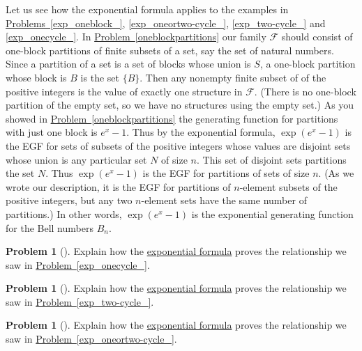 \documentclass[10pt,]{book}
\theoremstyle{plain}
\theoremstyle{definition}
\newtheorem{activity}[project]{Problem}
\theoremstyle{definition}
\numberwithin{equation}{chapter}
\newcommand{\F}{\mathcal{F}}
\begin{document}
Let us see how the exponential formula applies to the examples in \hyperref[exp_oneblock_]{Problems~\ref{exp_oneblock_}}, \hyperref[exp_oneortwo-cycle_]{\ref{exp_oneortwo-cycle_}}, \hyperref[exp_two-cycle_]{\ref{exp_two-cycle_}} and \hyperref[exp_onecycle_]{\ref{exp_onecycle_}}. In \hyperref[oneblockpartitions]{Problem~\ref{oneblockpartitions}} our family \(\F\) should consist of one-block partitions of finite subsets of a set, say the set of natural numbers.  Since a partition of a set is a set of blocks whose union is \(S\), a one-block partition whose block is \(B\) is the set \(\{B\}\). Then any nonempty finite subset of of the positive integers is the value of exactly one structure in \(\F\).  (There is no one-block partition of the empty set, so we have no structures using the empty set.) As you showed in \hyperref[oneblockpartitions]{Problem~\ref{oneblockpartitions}} the generating function for partitions with just one block is \(e^x-1\). Thus by the exponential formula, \(\exp(e^x-1)\) is the EGF for sets of subsets of the positive integers whose values are disjoint sets whose union is any particular set \(N\) of size \(n\). This set of disjoint sets partitions the set \(N\). Thus \(\exp(e^x-1)\) is the EGF for partitions of sets of size \(n\). (As we wrote our description, it is the EGF for partitions of \(n\)-element subsets of the positive integers, but any two \(n\)-element sets have the same number of partitions.) In other words, \(\exp(e^x-1)\) is the exponential generating function for the Bell numbers \(B_n\).%
\begin{activity}[] \label{activity-414}
\hypertarget{p-2181}{}%
Explain how the \hyperref[exponentialformulathm]{exponential formula} proves the relationship we saw in \hyperref[exp_onecycle_]{Problem~\ref{exp_onecycle_}}.%
\end{activity}
\begin{activity}[] \label{activity-415}
\hypertarget{p-2183}{}%
Explain how the \hyperref[exponentialformulathm]{exponential formula} proves the relationship we saw in \hyperref[exp_two-cycle_]{Problem~\ref{exp_two-cycle_}}.%
\end{activity}
\begin{activity}[] \label{activity-416}
\hypertarget{p-2185}{}%
Explain how the \hyperref[exponentialformulathm]{exponential formula} proves the relationship we saw in \hyperref[exp_oneortwo-cycle_]{Problem~\ref{exp_oneortwo-cycle_}}.%
\end{activity}
\end{document}

